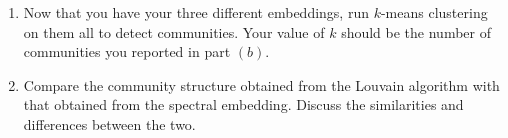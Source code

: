 \documentclass{article}
\begin{document}
\begin{tcolorbox}[colback = gray!16, enhanced, boxrule=0pt, frame hidden, sharp corners, borderline west={3pt}{-1.5pt}{black!80},breakable]
\begin{enumerate}[$(a)$]
(\textit{Hint: In Section 2, we did exactly this for only a single dimension by getting the Fiedler vector $e_2$. You can use this same method, just now with dimensions 3, 10, and 40.})

\item Now that you have your three different embeddings, run $k$-means clustering on them all to detect communities. Your value of $k$ should be the number of communities you reported in part $(b)$.

\item Compare the community structure obtained from the Louvain algorithm with that obtained from the spectral embedding. Discuss the similarities and differences between the two.
\end{enumerate}
\end{tcolorbox}
\end{document}
